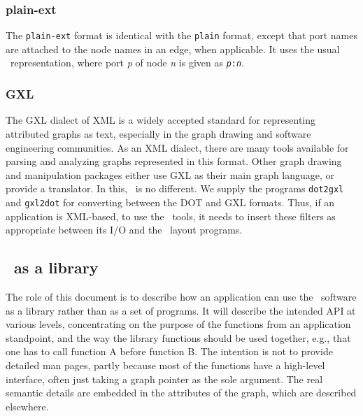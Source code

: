 \subsubsection{plain-ext}
The {\tt plain-ext} format is identical with the {\tt plain} format,
except that port names are attached to the node names in an edge,
when applicable. It uses the usual \DOT\ representation, where port
{\em p} of node {\em n} is given as {\tt {\em p}:{\em n}}.

\subsubsection{GXL}
The GXL \cite{gxl} dialect of XML is a widely accepted standard for
representing attributed graphs as text, especially in the graph
drawing and software engineering communities. As an XML dialect, there
are many tools available for parsing and analyzing graphs represented
in this format. Other graph drawing and manipulation packages either 
use GXL as their main graph language, or provide a translator.  
In this, \gviz\ is no different. We supply the programs
{\tt dot2gxl} and {\tt gxl2dot} for converting between the DOT and
GXL formats. Thus, if an application is XML-based, to use the
\gviz\ tools, it needs to insert these filters as appropriate between
its I/O and the \gviz\ layout programs.  

\subsection{\gviz\ as a library}
The role of this document is to describe how an application can use the
\gviz\ software as a library rather than as a set of programs. It will
describe the intended API at various levels, concentrating on the purpose
of the functions from an application standpoint, and the way the 
library functions should be used together, e.g., that one has to call
function A before function B. The intention is not to provide
detailed man pages, partly because most of the functions have a high-level 
interface, often just taking a graph pointer as the sole argument.
The real semantic details are embedded in the
attributes of the graph, which are described elsewhere. 

